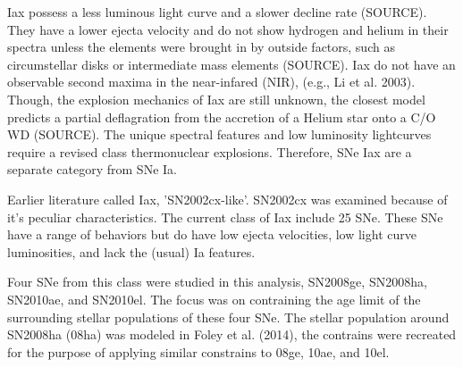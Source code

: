 \documentclass[preprint2]{aastex}
\begin{document}


Iax possess a less luminous light curve and a slower decline rate (SOURCE).
They have a lower ejecta velocity and do not show hydrogen and helium in their
 spectra unless the elements were brought in by outside factors,
such as circumstellar disks or intermediate mass elements (SOURCE). 
Iax do not have an observable second maxima in the near-infared (NIR), 
(e.g., Li et al. 2003).
Though, the explosion mechanics of Iax are still unknown, the closest model
predicts a partial deflagration from the accretion of a Helium star 
onto a C/O WD (SOURCE). 
The unique spectral features and low luminosity lightcurves require a revised class
thermonuclear explosions. 
Therefore, SNe Iax are a separate category from SNe Ia.

Earlier literature called Iax, 'SN2002cx-like'. SN2002cx was examined
because of it's peculiar characteristics. 
The current class of Iax include 25 SNe.
These SNe have a range of behaviors but do have low ejecta velocities, low light 
curve luminosities, and lack the (usual) Ia features.  

Four SNe from this class were studied in this analysis, SN2008ge, SN2008ha, 
SN2010ae, and SN2010el. 
The focus was on contraining the age limit of the
surrounding stellar populations of these four SNe.
The stellar population around SN2008ha (08ha) was modeled in Foley et al. (2014), 
the contrains were recreated for the purpose of applying similar 
constrains to 08ge, 10ae, and 10el. 
\end{document}

